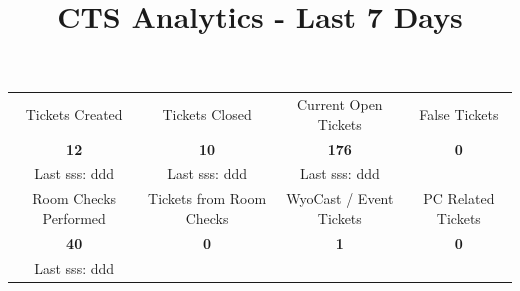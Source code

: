 \documentclass{article}
\begin{document}
         \begin{landscape} %
 
         \title{\textbf{\huge CTS Analytics - Last 7 Days}}
         \author{} %
         \date{} %
 
         \Large
         \setlength{\droptitle}{-5.5cm}
 
         \maketitle
         \thispagestyle{empty} %
 
          \begin{flushleft}
  
  
    
    
    

            \vspace{-2.25cm}
            \begin{center}
            \begin{tabular}{ c|c|c|c } 
                {\small Tickets Created}                 & {\small Tickets Closed}                 & {\small Current Open Tickets}                 & {\small False Tickets}                \\ 
                {\LARGE \textbf{12}}  & {\LARGE \textbf{10}}  & {\LARGE \textbf{176}}  & {\LARGE \textbf{0}} \\ 
                {\small Last sss: ddd}                     & {\small Last sss: ddd}                    & {\small Last sss: ddd}                          & {}                                    \\
            \hline
                {\small Room Checks Performed}                 & {\small Tickets from Room Checks}                 & {\small WyoCast / Event Tickets}              & {\small PC Related Tickets}                \\ 
                {\LARGE \textbf{40}}  & {\LARGE \textbf{0}}  & {\Large \textbf{1}}  & {\Large \textbf{0}} \\ 
                {\small Last sss: ddd}                           & {}                                                & {}                                            & {}                                         \\ 
            \end{tabular}
            \end{center}
    

\end{flushleft}
\end{landscape}
\end{document}
